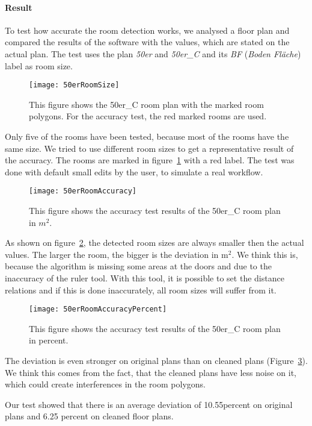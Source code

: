 \paragraph{Result}
To test how accurate the room detection works, we analysed a floor plan and compared the results of the software with the values, which are stated on the actual plan. The test uses the plan \textit{50er} and \textit{50er\_C} and its \textit{BF} (\textit{Boden Fläche}) label as room size.

\begin{figure}[H]
	\centering
	\texttt{[image: 50erRoomSize]}
	\caption{This figure shows the 50er\_C room plan with the marked room polygons. For the accuracy test, the red marked rooms are used.}
	\label{fig:50erRoomSize}
\end{figure}

Only five of the rooms have been tested, because most of the rooms have the same size. We tried to use different room sizes to get a representative result of the accuracy. The rooms are marked in figure~\ref{fig:50erRoomSize} with a red label. The test was done with default small edits by the user, to simulate a real workflow.

\begin{figure}[H]
	\centering
	\texttt{[image: 50erRoomAccuracy]}
	\caption{This figure shows the accuracy test results of the 50er\_C room plan in $m^{2}$.}
	\label{fig:50erRoomAccuracy}
\end{figure}

As shown on figure~\ref{fig:50erRoomAccuracy}, the detected room sizes are always smaller then the actual values. The larger the room, the bigger is the deviation in m$^{2}$. We think this is, because the algorithm is missing some areas at the doors and due to the inaccuracy of the ruler tool. With this tool, it is possible to set the distance relations and if this is done inaccurately, all room sizes will suffer from it.

\begin{figure}[H]
	\centering
	\texttt{[image: 50erRoomAccuracyPercent]}
	\caption{This figure shows the accuracy test results of the 50er\_C room plan in percent.}
	\label{fig:50erRoomAccuracyPercent}
\end{figure}

The deviation is even stronger on original plans than on cleaned plans (Figure~\ref{fig:50erRoomAccuracyPercent}). We think this comes from the fact, that the cleaned plans have less noise on it, which could create interferences in the room polygons.

Our test showed that there is an average deviation of 10.55percent on original plans and 6.25 percent on cleaned floor plans.



